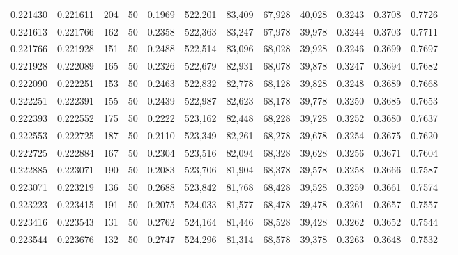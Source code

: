 \begin{tabular}{rrrrrrrrrrrrr}
0.221430 & 0.221611 &   204 &  50 &                                     0.1969 & 522,201 &  83,409 &  67,928 &  40,028 & 0.3243 & 0.3708 & 0.7726 \\
0.221613 & 0.221766 &   162 &  50 &                                     0.2358 & 522,363 &  83,247 &  67,978 &  39,978 & 0.3244 & 0.3703 & 0.7711 \\
0.221766 & 0.221928 &   151 &  50 &                                     0.2488 & 522,514 &  83,096 &  68,028 &  39,928 & 0.3246 & 0.3699 & 0.7697 \\
0.221928 & 0.222089 &   165 &  50 &                                     0.2326 & 522,679 &  82,931 &  68,078 &  39,878 & 0.3247 & 0.3694 & 0.7682 \\
0.222090 & 0.222251 &   153 &  50 &                                     0.2463 & 522,832 &  82,778 &  68,128 &  39,828 & 0.3248 & 0.3689 & 0.7668 \\
0.222251 & 0.222391 &   155 &  50 &                                     0.2439 & 522,987 &  82,623 &  68,178 &  39,778 & 0.3250 & 0.3685 & 0.7653 \\
0.222393 & 0.222552 &   175 &  50 &                                     0.2222 & 523,162 &  82,448 &  68,228 &  39,728 & 0.3252 & 0.3680 & 0.7637 \\
0.222553 & 0.222725 &   187 &  50 &                                     0.2110 & 523,349 &  82,261 &  68,278 &  39,678 & 0.3254 & 0.3675 & 0.7620 \\
0.222725 & 0.222884 &   167 &  50 &                                     0.2304 & 523,516 &  82,094 &  68,328 &  39,628 & 0.3256 & 0.3671 & 0.7604 \\
0.222885 & 0.223071 &   190 &  50 &                                     0.2083 & 523,706 &  81,904 &  68,378 &  39,578 & 0.3258 & 0.3666 & 0.7587 \\
0.223071 & 0.223219 &   136 &  50 &                                     0.2688 & 523,842 &  81,768 &  68,428 &  39,528 & 0.3259 & 0.3661 & 0.7574 \\
0.223223 & 0.223415 &   191 &  50 &                                     0.2075 & 524,033 &  81,577 &  68,478 &  39,478 & 0.3261 & 0.3657 & 0.7557 \\
0.223416 & 0.223543 &   131 &  50 &                                     0.2762 & 524,164 &  81,446 &  68,528 &  39,428 & 0.3262 & 0.3652 & 0.7544 \\
0.223544 & 0.223676 &   132 &  50 &                                     0.2747 & 524,296 &  81,314 &  68,578 &  39,378 & 0.3263 & 0.3648 & 0.7532 \\

\end{tabular}
